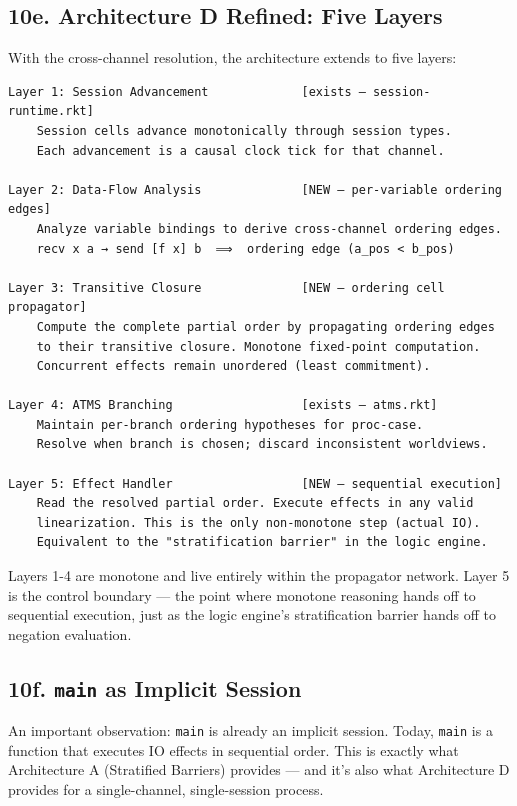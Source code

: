 \documentclass[11pt]{article}
\begin{document}
\subsection{10e. Architecture D Refined: Five Layers}
\label{sec:org609df56}

With the cross-channel resolution, the architecture extends to five layers:

\begin{verbatim}
Layer 1: Session Advancement             [exists — session-runtime.rkt]
    Session cells advance monotonically through session types.
    Each advancement is a causal clock tick for that channel.

Layer 2: Data-Flow Analysis              [NEW — per-variable ordering edges]
    Analyze variable bindings to derive cross-channel ordering edges.
    recv x a → send [f x] b  ⟹  ordering edge (a_pos < b_pos)

Layer 3: Transitive Closure              [NEW — ordering cell propagator]
    Compute the complete partial order by propagating ordering edges
    to their transitive closure. Monotone fixed-point computation.
    Concurrent effects remain unordered (least commitment).

Layer 4: ATMS Branching                  [exists — atms.rkt]
    Maintain per-branch ordering hypotheses for proc-case.
    Resolve when branch is chosen; discard inconsistent worldviews.

Layer 5: Effect Handler                  [NEW — sequential execution]
    Read the resolved partial order. Execute effects in any valid
    linearization. This is the only non-monotone step (actual IO).
    Equivalent to the "stratification barrier" in the logic engine.
\end{verbatim}

Layers 1-4 are monotone and live entirely within the propagator network.
Layer 5 is the control boundary — the point where monotone reasoning hands
off to sequential execution, just as the logic engine's stratification barrier
hands off to negation evaluation.
\subsection{10f. \texttt{main} as Implicit Session}
\label{sec:orge3f36a0}

An important observation: \texttt{main} is already an implicit session. Today,
\texttt{main} is a function that executes IO effects in sequential order. This is
exactly what Architecture A (Stratified Barriers) provides — and it's also
what Architecture D provides for a single-channel, single-session process.
\end{document}
